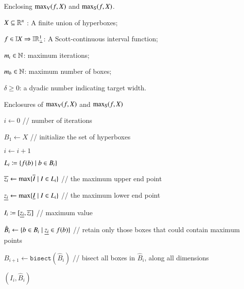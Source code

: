 \documentclass[11pt,times]{article}
\begin{document}
\begin{algorithm}[t]
  \caption{Enclosing $\maxV(f,X)$ and $\maxS(f,X)$.}

\begin{algorithmic}[1]
  \REQUIRE {\ }

  $X \subseteq \R^n$ : A finite union of hyperboxes;
  
  $f \in \intvaldom[X] \Rightarrow \intvaldom[\R^1\lift]$:  A Scott-continuous interval function;

  
  $m_{\iota} \in \N$: maximum iterations;

  $m_b \in \N$: maximum number of boxes;
  
  $\delta \geq 0$: a dyadic number indicating target width.


  \ENSURE Enclosures of $\maxV(f,X)$ and $\maxS(f,X)$

 \STATE $i \gets 0$ \quad // number of iterations  

  \STATE $B_1 \gets X$ \quad // initialize the set of hyperboxes

  \REPEAT
  
 \STATE $i \gets i+1$
  
 \STATE $L_i\defeq \setbarNormal{ f(b)}{ b \in B_i}$

  \STATE $\uep[z_i] \gets \max \setbarNormal{\uep[I]}{ I \in L_i}$  // the maximum upper end point


 \STATE $\lep[z_i] \gets \max \setbarNormal{\lep[I]}{ I \in L_i}$ 
 // the maximum lower end point

 \STATE  $I_i \defeq [{\lep[z_i], \uep[z_i]}]$ \quad // maximum value
 

 \STATE \label{alg:line:retain_boxes}
 $\hat{B}_i \gets \setbarNormal{b \in B_i}{\lep[z_i] \in f(b) }$ \quad // retain only those boxes
 that could contain maximum points

 
  {\label{alg:line:if:bisect}}
\STATE \label{alg:line:bisect} $B_{i+1} \gets \mathtt{bisect}(\hat{B}_i)$
\quad // bisect all boxes in $\hat{B}_i$, along all dimensions

\ENDIF
 
  \label{alg:line:stop_cond}



\RETURN $(I_i, \hat{B}_i)$
  
\end{algorithmic}
\label{alg:interval_max}
\end{algorithm}
\end{document}
